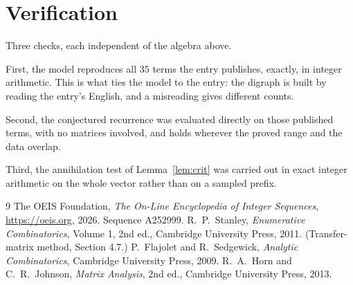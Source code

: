 \documentclass[11pt,a4paper]{article}
\theoremstyle{plain}
\theoremstyle{definition}
\begin{document}
\section{Verification}

Three checks, each independent of the algebra above.

First, the model reproduces all $35$ terms the entry publishes, exactly, in integer
arithmetic. This is what ties the model to the entry: the digraph is built by reading the
entry's English, and a misreading gives different counts.

Second, the conjectured recurrence was evaluated directly on those published terms, with no
matrices involved, and holds wherever the proved range and the data overlap.

Third, the annihilation test of Lemma~\ref{lem:crit} was carried out in exact integer
arithmetic on the whole vector rather than on a sampled prefix.

\begin{thebibliography}{9}
 The OEIS Foundation, \emph{The On-Line Encyclopedia of Integer
Sequences}, \url{https://oeis.org}, 2026. Sequence A252999.
 R.~P.~Stanley, \emph{Enumerative Combinatorics}, Volume 1, 2nd ed.,
Cambridge University Press, 2011. (Transfer-matrix method, Section 4.7.)
 P.~Flajolet and R.~Sedgewick, \emph{Analytic Combinatorics}, Cambridge
University Press, 2009.
 R.~A.~Horn and C.~R.~Johnson, \emph{Matrix Analysis}, 2nd ed., Cambridge
University Press, 2013.
\end{thebibliography}
\end{document}
